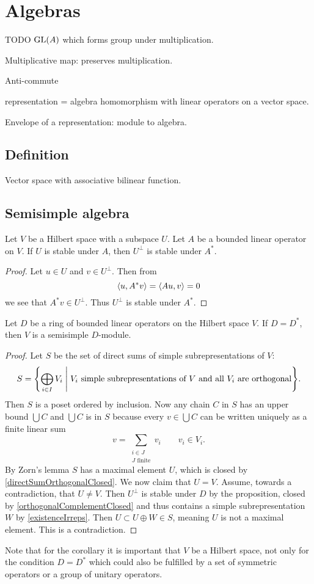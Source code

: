 \chapter{Algebras}
TODO $\operatorname{GL}(A)$ which forms group under multiplication.

Multiplicative map: preserves multiplication.

Anti-commute

representation = algebra homomorphism with linear operators on a vector space.

Envelope of a representation: module to algebra.

\section{Definition}
\begin{definition}
Vector space with associative bilinear function.
\end{definition}


\section{Semisimple algebra}
\begin{proposition}
Let $V$ be a Hilbert space with a subspace $U$. Let $A$ be a bounded linear operator on $V$. If $U$ is stable under $A$, then $U^\perp$ is stable under $A^*$.
\end{proposition}
\begin{proof}
Let $u\in U$ and $v\in U^\perp$. Then from
\[ \inner{u, A^*v} = \inner{Au,v} = 0 \]
we see that $A^*v \in U^\perp$. Thus $U^\perp$ is stable under $A^*$.
\end{proof}
\begin{corollary}
Let $D$ be a ring of bounded linear operators on the Hilbert space $V$. If $D=D^*$, then $V$ is a semisimple $D$-module.
\end{corollary}
\begin{proof}
Let $S$ be the set of direct sums of simple subrepresentations of $V$:
\[ S = \setbuilder{\bigoplus_{i\in I}V_i }{\text{$V_i$ simple subrepresentations of $V$ and all $V_i$ are orthogonal}}. \]
Then $S$ is a poset ordered by inclusion. Now any chain $C$ in $S$ has an upper bound $\bigcup C$ and $\bigcup C$ is in $S$ because every $v\in\bigcup C$ can be written uniquely as a finite linear sum
\[ v = \sum_{\substack{i\in J\\ \text{$J$ finite}}} v_i \qquad v_i\in V_i. \]
By Zorn's lemma $S$ has a maximal element $U$, which is closed by \ref{directSumOrthogonalClosed}. We now claim that $U=V$. Assume, towards a contradiction, that $U\neq V$. Then $U^\perp$ is stable under $D$ by the proposition, closed by \ref{orthogonalComplementClosed} and thus contains a simple subrepresentation $W$ by \ref{existenceIrreps}. Then $U\subset U\oplus W \in S$, meaning $U$ is not a maximal element. This is a contradiction.
\end{proof}
Note that for the corollary it is important that $V$ be a Hilbert space, not only for the condition $D=D^*$ which could also be fulfilled by a set of symmetric operators or a group of unitary operators.


